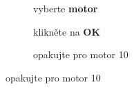 \documentclass[main.tex]{subfiles}
\begin{document}
	\begin{figure}[h!]%
		\begin{subfigure}{.3\textwidth}%
			\centering%
			\caption{vyberte \textbf{motor}}%
		\end{subfigure} \hspace{.045\textwidth}%
		\begin{subfigure}{.3\textwidth}%
			\centering%
			\caption{klikněte na \textbf{OK}}%
		\end{subfigure} \hspace{.045\textwidth}%
		\begin{subfigure}{.3\textwidth}%
			\centering%
			\caption{opakujte pro motor 10}%
		\end{subfigure}%
	\end{figure}
\end{document}
